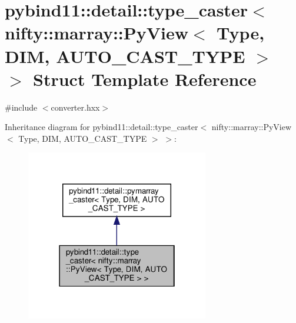 \hypertarget{structpybind11_1_1detail_1_1type__caster_3_01nifty_1_1marray_1_1PyView_3_01Type_00_01DIM_00_01AUTO__CAST__TYPE_01_4_01_4}{}\section{pybind11\+:\+:detail\+:\+:type\+\_\+caster$<$ nifty\+:\+:marray\+:\+:Py\+View$<$ Type, D\+IM, A\+U\+T\+O\+\_\+\+C\+A\+S\+T\+\_\+\+T\+Y\+PE $>$ $>$ Struct Template Reference}
\label{structpybind11_1_1detail_1_1type__caster_3_01nifty_1_1marray_1_1PyView_3_01Type_00_01DIM_00_01AUTO__CAST__TYPE_01_4_01_4}


{\ttfamily \#include $<$converter.\+hxx$>$}



Inheritance diagram for pybind11\+:\+:detail\+:\+:type\+\_\+caster$<$ nifty\+:\+:marray\+:\+:Py\+View$<$ Type, D\+IM, A\+U\+T\+O\+\_\+\+C\+A\+S\+T\+\_\+\+T\+Y\+PE $>$ $>$\+:
\nopagebreak
\begin{figure}[H]
\begin{center}
\leavevmode
\includegraphics[width=226pt]{structpybind11_1_1detail_1_1type__caster_3_01nifty_1_1marray_1_1PyView_3_01Type_00_01DIM_00_01AUb894e346011632bef1775f10f1a6e4df}
\end{center}
\end{figure}


